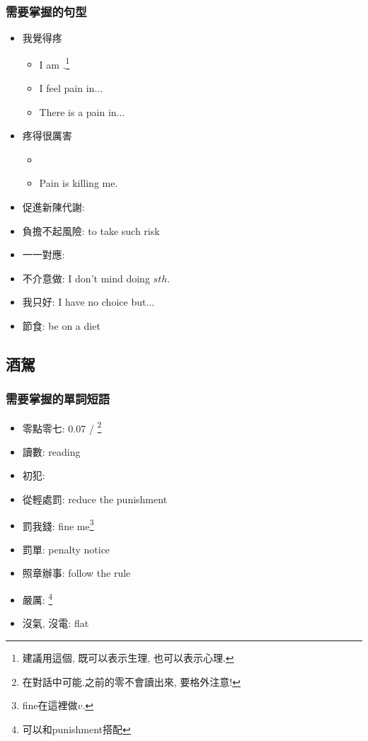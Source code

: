 \subsubsection*{需要掌握的句型}
\begin{itemize}
  \itemsep0em
  \item 我覺得疼
  \begin{itemize}
  \itemsep0em
  	\item I am .\footnote{建議用這個, 既可以表示生理, 也可以表示心理.}
  	\item I feel pain in...
  	\item There is a pain in...
  \end{itemize}
  \item 疼得很厲害
  \begin{itemize}
  \itemsep0em
  	\item {}
  	\item Pain is killing me.
  \end{itemize}
  \item 促進新陳代謝: 
  \item 負擔不起風險:  to take such risk
  \item 一一對應: 
  \item 不介意做: I don't mind doing $sth.$
  \item 我只好: I have no choice but...
  \item 節食: be on a diet
\end{itemize}

\subsection{酒駕}
\subsubsection*{需要掌握的單詞短語}
\begin{multicols}{3}
\begin{itemize}
  \itemsep0em
  \item 零點零七: 0.07 / \footnote{在對話中可能.之前的零不會讀出來, 要格外注意!}
  \item 讀數: reading
  \item 初犯: 
  \item 從輕處罰: reduce the punishment
  \item 罰我錢: fine me\footnote{fine在這裡做$v.$}
  \item 罰單: penalty notice
  \item 照章辦事: follow the rule
  \item 嚴厲: \footnote{可以和punishment搭配}
  \item 沒氣, 沒電: flat
\end{itemize}
\end{multicols}

